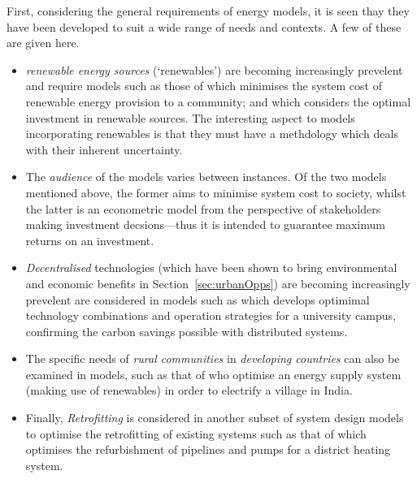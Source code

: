 First, considering the general requirements of energy models, it is seen thay they have been developed to suit a wide range of needs and contexts. A few of these are given here. 
\begin{itemize}
	\item \emph{renewable energy sources} (`renewables') are becoming increasingly prevelent and require models such as those of \citet{Cai2009a} which minimises the system cost of renewable energy provision to a community; and \citet{Fleten2007} which considers the optimal investment in renewable sources. The interesting aspect to models incorporating renewables is that they must have a methdology which deals with their inherent uncertainty. 
	\item The \emph{audience} of the models varies between instances. Of the two models mentioned above, the former aims to minimise system cost to society, whilst the latter is an econometric model from the perspective of stakeholders making investment decsions---thus it is intended to guarantee maximum returns on an investment.  
	\item \emph{Decentralised} technologies (which have been shown to bring environmental and economic benefits in Section~\ref{sec:urbanOpps}) are becoming increasingly prevelent are considered in models such as \citet{Ren2010} which develops optimimal technology combinations and operation strategies for a university campus, confirming the carbon savings possible with distributed systems. 
	\item The specific needs of \emph{rural communities} in \emph{developing countries} can also be examined in models, such as that of \citet{Kumaravel2012} who optimise an energy supply system (making use of renewables) in order to electrify a village in India. 
	\item Finally, \emph{Retrofitting} is considered in another subset of system design models to optimise the retrofitting of existing systems such as that of \citet{Bojic2010} which optimises the refurbishment of pipelines and pumps for a district heating system.
\end{itemize}

